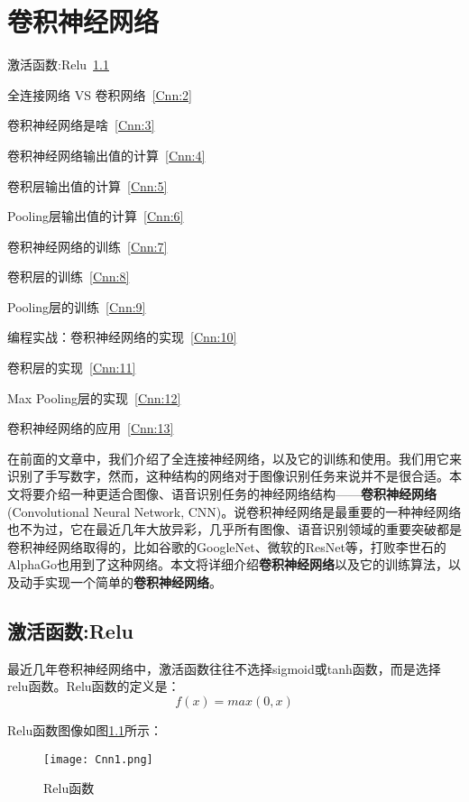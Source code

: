 \chapter{卷积神经网络}\label{chap:Cnn}

\begin{introduction}
	\item 激活函数:Relu~\ref{Cnn:1}
	\item 全连接网络 VS 卷积网络~\ref{Cnn:2}
	\item 卷积神经网络是啥~\ref{Cnn:3}
	\item 卷积神经网络输出值的计算~\ref{Cnn:4}
	\item 卷积层输出值的计算~\ref{Cnn:5}
	\item Pooling层输出值的计算~\ref{Cnn:6}
	\item 卷积神经网络的训练~\ref{Cnn:7}
	\item 卷积层的训练~\ref{Cnn:8}
	\item Pooling层的训练~\ref{Cnn:9}
	\item 编程实战：卷积神经网络的实现~\ref{Cnn:10}
	\item 卷积层的实现~\ref{Cnn:11}
	\item Max Pooling层的实现~\ref{Cnn:12}
	\item 卷积神经网络的应用~\ref{Cnn:13}
\end{introduction}

在前面的文章中，我们介绍了全连接神经网络，以及它的训练和使用。我们用它来识别了手写数字，然而，这种结构的网络对于图像识别任务来说并不是很合适。本文将要介绍一种更适合图像、语音识别任务的神经网络结构------\textbf{卷积神经网络}(Convolutional Neural Network,
CNN)。说卷积神经网络是最重要的一种神经网络也不为过，它在最近几年大放异彩，几乎所有图像、语音识别领域的重要突破都是卷积神经网络取得的，比如谷歌的GoogleNet、微软的ResNet等，打败李世石的AlphaGo也用到了这种网络。本文将详细介绍\textbf{卷积神经网络}以及它的训练算法，以及动手实现一个简单的\textbf{卷积神经网络}。

\section{激活函数:Relu}\label{Cnn:1}

最近几年卷积神经网络中，激活函数往往不选择sigmoid或tanh函数，而是选择relu函数。Relu函数的定义是：
\[
	f(x)= max(0,x)
\]

Relu函数图像如图\ref{fig:Cnn1}所示：
\begin{figure}[!h]
	\centering
	\texttt{[image: Cnn1.png]}
	\caption{Relu函数}
	\label{fig:Cnn1}
\end{figure}


